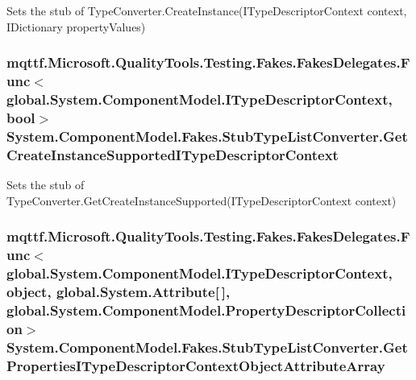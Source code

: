 Sets the stub of Type\-Converter.\-Create\-Instance(\-I\-Type\-Descriptor\-Context context, I\-Dictionary property\-Values)

\hypertarget{class_system_1_1_component_model_1_1_fakes_1_1_stub_type_list_converter_aa065accb9e3ab1174108c6ceb7ac19e0}{
\subsubsection[{Get\-Create\-Instance\-Supported\-I\-Type\-Descriptor\-Context}]{\setlength{\rightskip}{0pt plus 5cm}mqttf.\-Microsoft.\-Quality\-Tools.\-Testing.\-Fakes.\-Fakes\-Delegates.\-Func$<$global.\-System.\-Component\-Model.\-I\-Type\-Descriptor\-Context, bool$>$ System.\-Component\-Model.\-Fakes.\-Stub\-Type\-List\-Converter.\-Get\-Create\-Instance\-Supported\-I\-Type\-Descriptor\-Context}}\label{class_system_1_1_component_model_1_1_fakes_1_1_stub_type_list_converter_aa065accb9e3ab1174108c6ceb7ac19e0}


Sets the stub of Type\-Converter.\-Get\-Create\-Instance\-Supported(\-I\-Type\-Descriptor\-Context context)

\hypertarget{class_system_1_1_component_model_1_1_fakes_1_1_stub_type_list_converter_a464cee2f3a16f7cb01b396570ce721f1}{
\subsubsection[{Get\-Properties\-I\-Type\-Descriptor\-Context\-Object\-Attribute\-Array}]{\setlength{\rightskip}{0pt plus 5cm}mqttf.\-Microsoft.\-Quality\-Tools.\-Testing.\-Fakes.\-Fakes\-Delegates.\-Func$<$global.\-System.\-Component\-Model.\-I\-Type\-Descriptor\-Context, object, global.\-System.\-Attribute\mbox{[}$\,$\mbox{]}, global.\-System.\-Component\-Model.\-Property\-Descriptor\-Collection$>$ System.\-Component\-Model.\-Fakes.\-Stub\-Type\-List\-Converter.\-Get\-Properties\-I\-Type\-Descriptor\-Context\-Object\-Attribute\-Array}}\label{class_system_1_1_component_model_1_1_fakes_1_1_stub_type_list_converter_a464cee2f3a16f7cb01b396570ce721f1}


